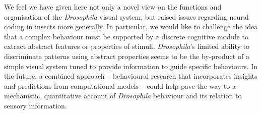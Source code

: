 We feel we have given here not only a novel view on the functions and organisation of the \emph{Drosophila} visual system, but raised issues regarding neural coding in insects more generally. In particular, we would like to challenge the idea that a complex behaviour must be supported by a discrete cognitive module to extract abstract features or properties of stimuli.
\emph{Drosophila}'s limited ability to discriminate patterns using abstract properties seems to be the by-product of a simple visual system tuned to provide information to guide specific behaviours.
In the future, a combined approach -- behavioural research that incorporates insights and predictions from computational models -- could help pave the way to a mechanistic, quantitative account of \emph{Drosophila} behaviour and its relation to sensory information.

